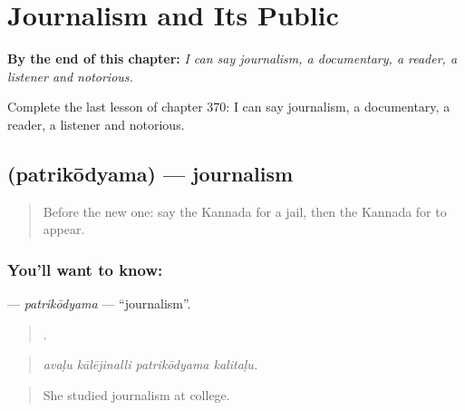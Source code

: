 
\chapter{Journalism and Its Public}
\label{ch:ka-journalism-and-its-public}

\begin{chapteropening}
\textbf{By the end of this chapter:} \emph{I can say journalism, a documentary, a reader, a listener and notorious.}

Complete the last lesson of chapter 370: I can say journalism, a documentary, a reader, a listener and notorious.
\end{chapteropening}

\section[\texorpdfstring{\kn{ಪತ್ರಿಕೋದ್ಯಮ} (patrikōdyama)}{ಪತ್ರಿಕೋದ್ಯಮ (patrikōdyama)}]{ (patrikōdyama) — journalism}

\label{lesson:KA-C370-patrikodyama}



\begin{quote}
Before the new one: say the Kannada for a jail, then the Kannada for to appear.
\end{quote}

\subsection*{You'll want to know: }
\textbf{} — \emph{patrikōdyama} — \textquotedblleft{}journalism\textquotedblright{}.

\begin{quote}
   .
\end{quote}

\begin{quote}
\emph{avaḷu kālējinalli patrikōdyama kalitaḷu.}
\end{quote}

\begin{quote}
She studied journalism at college.
\end{quote}

